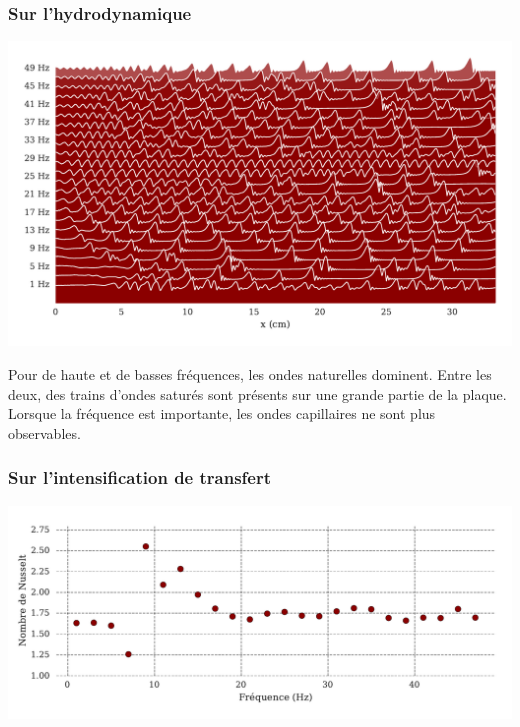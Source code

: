 \documentclass[a0,portrait]{a0poster}
\begin{document}
\begin{multicols}{2}
    \begin{multicols}{2}
        \subsubsection*{Sur l'hydrodynamique}

        \begin{center}
            \includegraphics[width=0.98\columnwidth]{01-frequency_effect}
            \label{fig:freq_effect}
        \end{center}

        Pour de haute et de basses fréquences, les ondes naturelles dominent. Entre les deux, des trains d'ondes saturés sont présents sur une grande partie de la plaque. Lorsque la fréquence est importante, les ondes capillaires ne sont plus observables.

        \columnbreak

        \subsubsection*{Sur l'intensification de transfert}

        \begin{center}
            \includegraphics[width=0.98\columnwidth]{01-Nusselt_freq}
            \label{fig:freq_effect_Nu}
        \end{center}


\end{multicols}
\end{multicols}
\end{document}

